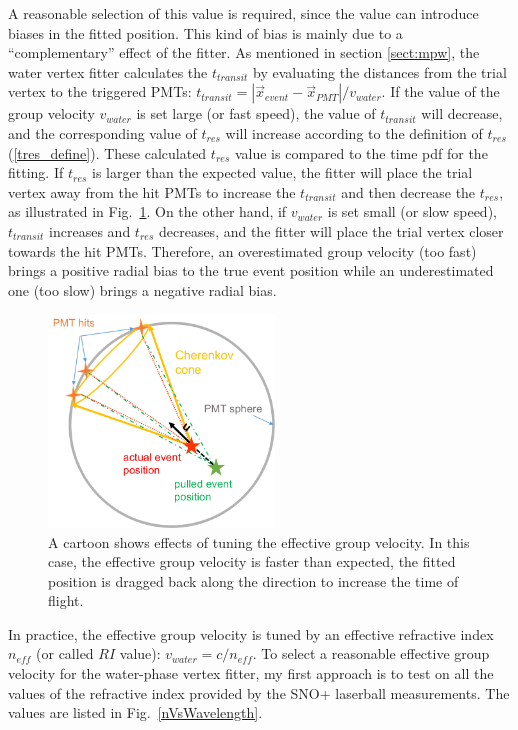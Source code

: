 A reasonable selection of this value is required, since the value can introduce biases in the fitted position. This kind of bias is mainly due to a ``complementary'' effect of the fitter. As mentioned in section \ref{sect:mpw}, the water vertex fitter calculates the $t_{transit}$ by evaluating the distances from the trial vertex to the triggered PMTs: $t_{transit}=|\vec{x}_{event}-\vec{x}_{PMT}|/v_{water}$. If the value of the group velocity $v_{water}$ is set large (or fast speed), the value of $t_{transit}$ will decrease, and the corresponding value of $t_{res}$ will increase according to the definition of $t_{res}$(\ref{tres_define}). These calculated $t_{res}$ value is compared to the time pdf for the fitting. If $t_{res}$ is larger than the expected value, the fitter will place the trial vertex away from the 
hit PMTs to increase the $t_{transit}$ and then decrease the $t_{res}$, as illustrated in Fig.~\ref{effectiveVg}. On the other hand, if $v_{water}$ is set small (or slow speed), $t_{transit}$ increases and $t_{res}$ decreases, and the fitter will place the trial vertex closer towards the hit PMTs.
Therefore, an overestimated group velocity (too fast) brings a positive radial bias to the true event position while an underestimated one (too slow) brings a negative radial bias.
\begin{figure}[!htb]
	\centering
	\includegraphics[width=6cm]{effectOfGroupVelocity.png}
	\caption{A cartoon shows effects of tuning the effective group velocity. In this case, the effective group velocity is faster than expected, the fitted position is dragged back along the direction to increase the time of flight.}
	\label{effectiveVg}
\end{figure}

In practice, the effective group velocity is tuned by an effective refractive index $n_{eff}$ (or called $RI$ value): $v_{water}=c/n_{eff}$. To select a reasonable effective group velocity for the water-phase vertex fitter, my first approach is to test on all the values of the refractive index provided by the SNO+ laserball measurements. The values are listed in Fig.~\ref{nVsWavelength}. 


